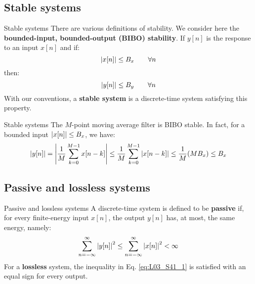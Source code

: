 \documentclass[../../main/main.tex]{subfiles}
\begin{document}
\subsection{Stable systems}
\begin{definition}{Stable systems}{}
    There are various definitions of stability. We consider here the \textbf{bounded-input, bounded-output (BIBO) stability}. If \( y[n] \) is the response to an input \( x[n] \) and if:
    \begin{equation}
        \abs{x[n]}
        \le
        B_{x}
        \qquad
        \forall n
        \label{eq:L03_S39_1}
    \end{equation}
    then:
    \begin{equation}
        \abs{y[n]}
        \le
        B_{y}
        \qquad
        \forall n
        \label{eq:L03_S39_2}
    \end{equation}
    With our conventions, a \textbf{stable system} is a discrete-time system satisfying this property.
\end{definition}

\begin{example}{Stable systems}{}
    The \( M \)-point moving average filter is BIBO stable. In fact, for a bounded input \( \abs{x[n]} \le B_{x} \), we have:
    \begin{equation}
        \abs{y[n]}
        =
        \abs{\frac{1}{M} \sum_{k=0}^{M-1} x[n-k]}
        \le
        \frac{1}{M} \sum_{k=0}^{M-1} \abs{x[n-k]}
        \le
        \frac{1}{M} \qty(MB_{x})
        \le
        B_{x}
        \label{eq:L03_S40_2}
    \end{equation}
\end{example}



\subsection{Passive and lossless systems}
\begin{definition}{Passive and lossless systems}{}
    A discrete-time system is defined to be \textbf{passive} if, for every finite-energy input \( x[n] \), the output \( y[n] \) has, at most, the same energy, namely:
    \begin{equation}
        \sum_{n = -\infty}^{\infty} \abs{y[n]}^{2}
        \le
        \sum_{n = -\infty}^{\infty} \abs{x[n]}^{2}
        <
        \infty
        \label{eq:L03_S41_1}
    \end{equation}
    For a \textbf{lossless} system, the inequality in Eq. \ref{eq:L03_S41_1} is satisfied with an equal sign for every output.
\end{definition}
\end{document}
